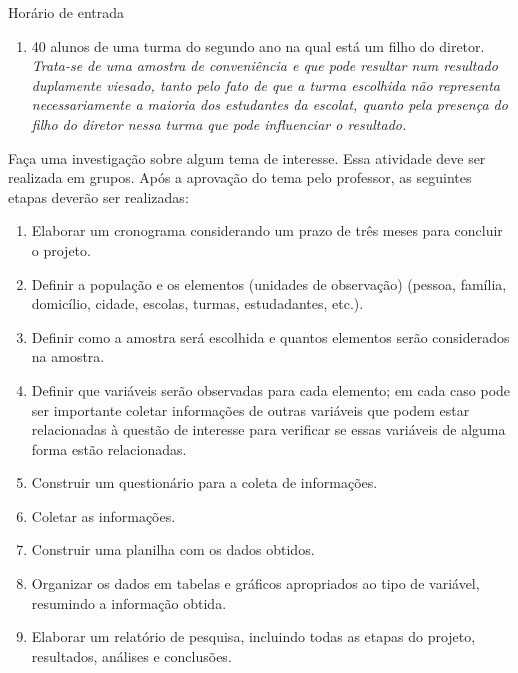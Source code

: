 {\begin{example}{Horário de entrada}
\begin{enumerate}
\item {} 
40 alunos de uma turma do segundo ano na qual está um filho do diretor. \emph{Trata-se de uma amostra de conveniência e que pode resultar num resultado duplamente viesado, tanto pelo fato de que a turma escolhida não representa necessariamente a maioria dos estudantes da escolat, quanto pela presença do filho do diretor nessa turma que pode influenciar o resultado.}

\end{enumerate}
\end{example}


\begin{project}
\label{est1-projeto-1}

Faça uma investigação sobre algum tema de interesse. Essa atividade deve ser realizada em grupos.  Após a aprovação do tema pelo professor, as seguintes etapas deverão ser realizadas:
\begin{enumerate}
\item {} 
Elaborar um cronograma considerando um prazo de três meses para concluir o projeto.

\item {} 
Definir a população e os elementos (unidades de observação) (pessoa, família, domicílio, cidade, escolas, turmas, estudadantes, etc.).

\item {} 
Definir como a amostra será escolhida e quantos elementos serão considerados na amostra.

\item {} 
Definir que variáveis serão observadas para cada elemento; em cada caso pode ser importante coletar informações de outras variáveis que podem estar relacionadas à questão de interesse para verificar se essas variáveis de alguma forma estão relacionadas.

\item {} 
Construir um questionário para a coleta de informações.

\item {} 
Coletar as informações.

\item {} 
Construir uma planilha com os dados obtidos.

\item {} 
Organizar os dados em tabelas e gráficos apropriados ao tipo de variável, resumindo a informação obtida.

\item {} 
Elaborar um relatório de pesquisa, incluindo todas as etapas do projeto, resultados, análises e conclusões.


\end{enumerate}
\end{project}}
